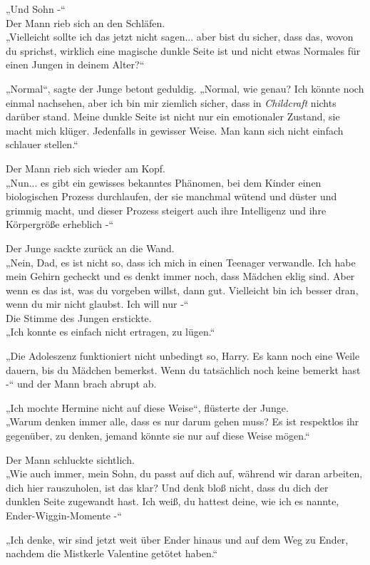 {„Und Sohn -“\\ Der Mann rieb sich an den Schläfen.\\ „Vielleicht sollte ich das jetzt nicht sagen... aber bist du sicher, dass das, wovon du sprichst, wirklich eine magische dunkle Seite ist und nicht etwas Normales für einen Jungen in deinem Alter?“

„Normal“, sagte der Junge betont geduldig. „Normal, wie genau? Ich könnte noch einmal nachsehen, aber ich bin mir ziemlich sicher, dass in \emph{Childcraft} nichts darüber stand. Meine dunkle Seite ist nicht nur ein emotionaler Zustand, sie macht mich klüger. Jedenfalls in gewisser Weise. Man kann sich nicht einfach schlauer stellen.“

Der Mann rieb sich wieder am Kopf.\\ „Nun... es gibt ein gewisses bekanntes Phänomen, bei dem Kinder einen biologischen Prozess durchlaufen, der sie manchmal wütend und düster und grimmig macht, und dieser Prozess steigert auch ihre Intelligenz und ihre Körpergröße erheblich -“

Der Junge sackte zurück an die Wand.\\ „Nein, Dad, es ist nicht so, dass ich mich in einen Teenager verwandle. Ich habe mein Gehirn gecheckt und es denkt immer noch, dass Mädchen eklig sind. Aber wenn es das ist, was du vorgeben willst, dann gut. Vielleicht bin ich besser dran, wenn du mir nicht glaubst. Ich will nur -“\\ Die Stimme des Jungen erstickte.\\ „Ich konnte es einfach nicht ertragen, zu lügen.“

„Die Adoleszenz funktioniert nicht unbedingt so, Harry. Es kann noch eine Weile dauern, bis du Mädchen bemerkst. Wenn du tatsächlich noch keine bemerkt hast -“ und der Mann brach abrupt ab.

„Ich mochte Hermine nicht auf diese Weise“, flüsterte der Junge.\\ „Warum denken immer alle, dass es nur darum gehen muss? Es ist respektlos ihr gegenüber, zu denken, jemand könnte sie nur auf diese Weise mögen.“

Der Mann schluckte sichtlich.\\ „Wie auch immer, mein Sohn, du passt auf dich auf, während wir daran arbeiten, dich hier rauszuholen, ist das klar? Und denk bloß nicht, dass du dich der dunklen Seite zugewandt hast. Ich weiß, du hattest deine, wie ich es nannte, Ender-Wiggin-Momente -“

„Ich denke, wir sind jetzt weit über Ender hinaus und auf dem Weg zu Ender, nachdem die Mistkerle Valentine getötet haben.“

}
